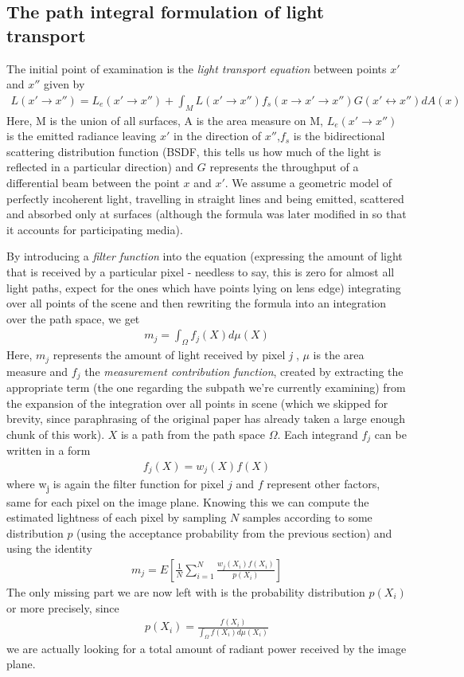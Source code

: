 \subsection{The path integral formulation of light transport}

The initial point of examination is the \emph{light transport equation} between points $x'$ and $x''$ given by
\begin{align*}
L(x' \to x'') = L_e(x' \to x'') + \int_M L(x' \to x'')f_s(x \to x' \to x'')G(x' \leftrightarrow x'')dA(x)
\end{align*} 
Here, M is the union of all surfaces, A is the area measure on M, $L_e(x' \to x'')$ is the emitted radiance leaving $x'$ in the direction of $x''$,$f_s$ is the bidirectional scattering distribution function (BSDF, this tells us how much of the light is reflected in a particular direction) and $G$ represents the throughput of a differential beam between the point $x$ and $x'$. We assume a geometric model of perfectly incoherent light, travelling in straight lines and being emitted, scattered and absorbed only at surfaces (although the formula was later modified in \cite{Pauly:2000:MLT:647652.732117} so that it accounts for participating media).

By introducing a \emph{filter function} into the equation (expressing the amount of light that is received by a particular pixel - needless to say, this is zero for almost all light paths, expect for the ones which have points lying on lens edge) integrating over all points of the scene and then rewriting the formula into an integration over the path space, we get
\begin{align*}
m_j = \int_\Omega f_j(X)d\mu(X)
\end{align*} 
Here, $m_j$ represents the amount of light received by pixel \emph{j} , $\mu$ is the area measure and $f_j$ the \emph{measurement contribution function}, created by extracting the appropriate term (the one regarding the subpath we're currently examining) from the expansion of the integration over all points in scene (which we skipped for brevity, since paraphrasing of the original paper has already taken a large enough chunk of this work). $X$ is a path from the path space $\Omega$.
Each integrand $f_j$ can be written in a form 
\begin{align*}
f_j(X) = w_j(X)f(X)
\end{align*} 
where w\textsubscript{j} is again the filter function for pixel $j$ and $f$ represent other factors, same for each pixel on the image plane. Knowing this we can compute the estimated lightness of each pixel by sampling $N$ samples according to some distribution $p$ (using the acceptance probability from the previous section) and using the identity
\begin{align*}
m_j=E\left[\frac{1}{N}\sum_{i=1}^{N}\frac{w_j(X_i)f(X_i)}{p(X_i)}\right]
\end{align*} 
The only missing part we are now left with is the probability distribution $p(X_i)$ or more precisely, since 
\begin{align*}
p(X_i)=\frac{f(X_i)}{\int_\Omega f(X_i)d\mu(X_i)}
\end{align*} 
we are actually looking for a total amount of radiant power received by the image plane. 

